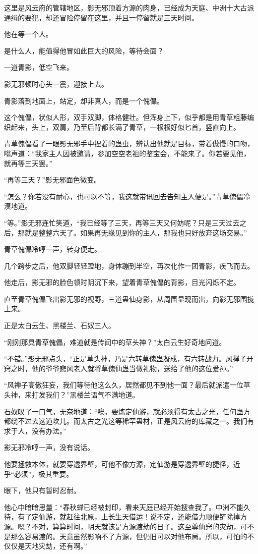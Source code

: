 \begin{this_body}
这里是风云府的管辖地区，影无邪顶着方源的肉身，已经成为天庭、中洲十大古派通缉的要犯，却还冒险停留在这里，并且一停留就是三天时间。

他在等一个人。

是什么人，能值得他冒如此巨大的风险，等待会面？

一道青影，低空飞来。

影无邪顿时心头一震，迎接上去。

青影落到地面上，站定，却非真人，而是一个傀儡。

这个傀儡，状似人形，双手双脚，体格健壮。但浑身上下，似乎都是用青草粗藤编织起来，头上，双肩，乃至后背都长满了青草，一根根好似匕首，竖直向上。

青草傀儡看了一眼影无邪手中捏着的蛊虫，辨认出他就是目标，带着傲慢的口吻，嗡声道：“我家主人因被邀请，参加空空老祖的鉴宝会，不能来了。你若要见他，就再等三天罢。”

“再等三天？”影无邪面色微变。

“怎么？你若没有耐心，也可以不等，我这就带讯回去告知主人便是。”青草傀儡冷漠地道。

“等。”影无邪连忙笑道，“我已经等了三天，再等三天又何妨呢？只是三天过去之后，那就是整整六天了。如果再无缘见到你的主人，那我也只好放弃这场交易。”

青草傀儡冷哼一声，转身便走。

几个跨步之后，他双脚轻轻蹬地，身体蹦到半空，再次化作一团青影，疾飞而去。

他走后，影无邪的脸色顿时阴沉下来，望着青草傀儡的背影，目光闪烁不定。

直至青草傀儡飞出影无邪的视野，三道蛊仙身影，从周围显现而出，向影无邪围拢上来。

正是太白云生、黑楼兰、石奴三人。

“刚刚那具青草傀儡，难道就是传闻中的草头神？”太白云生好奇地问道。

“不错。”影无邪点头，“正是草头神，乃是六转草傀蛊凝成，有六转战力。风禅子开窍之时，他的爷爷悲风老人就将草傀仙蛊当做礼物，送给了他的这位爱孙。”

“风禅子高傲狂妄，我们等待他这么久，居然都见不到他一面？最后就派遣一位草头神，来打发我们？”黑楼兰语气不满地道。

石奴叹了一口气，无奈地道：“唉，要炼定仙游，就必须得有太古之光，任何蛊方都绕不过去这道坎儿。而太古之光这等稀罕蛊材，正是风云府的库藏之一。我们有求于人，没有办法。”

影无邪冷哼一声，没有说话。

他要拯救本体，就要穿透界壁，可他不像方源，定仙游是穿透界壁的捷径，近乎“必须”，极其重要。

眼下，他只有暂时忍耐。

他心中暗暗思量：“春秋蝉已经被封印，看来天庭已经开始搜查我了。中洲不能久待，有了定仙游，就赶往北原，上长生天借运！说不定，还能借力顺便铲除掉方源。嗯？不对，算算时间，明天就该是方源渡劫的日子。这至尊仙窍的灾劫，可不是那么容易渡的。天意虽然影响不了方源，但仍旧可以对他布局。所以，可怕的不仅仅是天地灾劫，还有啊。”

\end{this_body}


